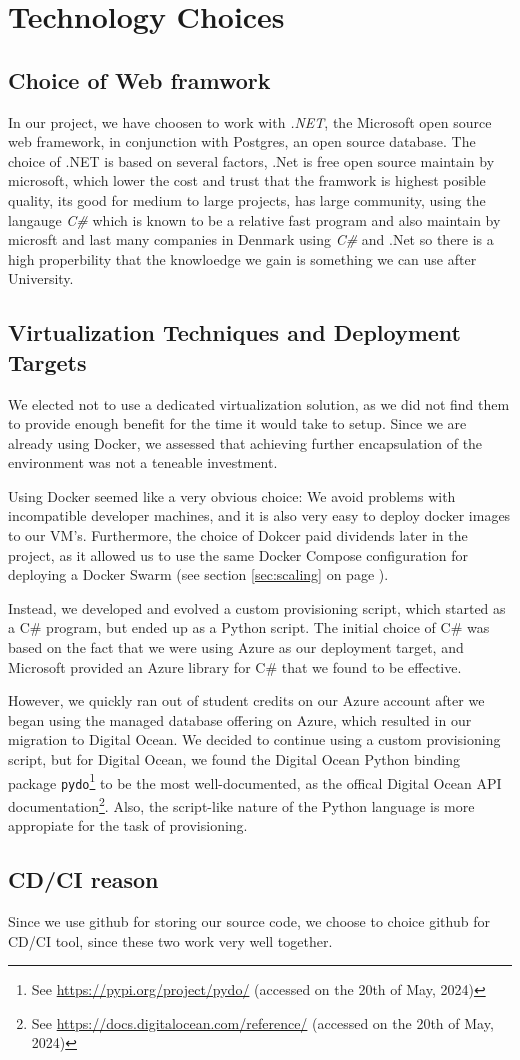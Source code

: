 
\section{Technology Choices}

\subsection{Choice of Web framwork}
In our project, we have choosen to work with \textit{.NET}, the Microsoft open source web framework, in conjunction with Postgres, an open source database.
The choice of .NET is based on several factors, .Net is free open source maintain by microsoft, which lower the cost and trust that the framwork is highest posible quality, its good for medium to large projects, has large community, using the langauge \textit{C\#} which is known to be a relative fast program and also maintain by microsft and last many companies in Denmark using \textit{C\#} and .Net so there is a high properbility that the knowloedge we gain is something we can use after University. 

\subsection{Virtualization Techniques and Deployment Targets}

We elected not to use a dedicated virtualization solution, as we did not find them to provide enough benefit for the time it would take to setup. Since we are already using Docker, we assessed that achieving further encapsulation of the environment was not a teneable investment.

Using Docker seemed like a very obvious choice: We avoid problems with incompatible developer machines, and it is also very easy to deploy docker images to our VM's. Furthermore, the choice of Dokcer paid dividends later in the project, as it allowed us to use the same Docker Compose configuration for deploying a Docker Swarm (see section \ref{sec:scaling} on page \pageref{sec:scaling}).

Instead, we developed and evolved a custom provisioning script, which started as a C\# program, but ended up as a Python script.
The initial choice of C\# was based on the fact that we were using Azure as our deployment target, and Microsoft provided an Azure library for C\# that we found to be effective.

However, we quickly ran out of student credits on our Azure account after we began using the managed database offering on Azure, which resulted in our migration to Digital Ocean.
We decided to continue using a custom provisioning script, but for Digital Ocean, we found the Digital Ocean Python binding package \texttt{pydo}\footnote{See \url{https://pypi.org/project/pydo/} (accessed on the 20th of May, 2024)} to be the most well-documented, as the offical Digital Ocean API documentation\footnote{See \url{https://docs.digitalocean.com/reference/} (accessed on the 20th of May, 2024)}.
Also, the script-like nature of the Python language is more appropiate for the task of provisioning.


\subsection{CD/CI reason}
Since we use github for storing our source code, we choose to choice github for CD/CI tool, since these two work very well together.


